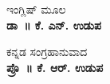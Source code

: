 \thispagestyle{empty}


\begin{center}
ಇಂಗ್ಲಿಷ್ ಮೂಲ\\\textbf{ಡಾ~॥ ಕೆ. ಎನ್. ಉಡುಪ}
\end{center}

\begin{center}
ಕನ್ನಡ ಸಂಗ್ರಹಾನುವಾದ\\\textbf{ಪ್ರೊ~॥ ಕೆ. ಆರ್. ಉಡುಪ}
\end{center}


